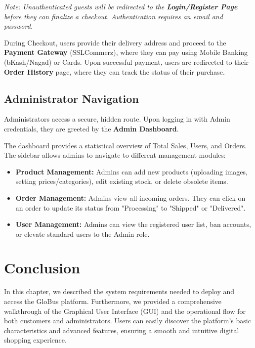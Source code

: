 \textit{Note: Unauthenticated guests will be redirected to the \textbf{Login/Register Page} before they can finalize a checkout. Authentication requires an email and password.}

During Checkout, users provide their delivery address and proceed to the \textbf{Payment Gateway} (SSLCommerz), where they can pay using Mobile Banking (bKash/Nagad) or Cards. Upon successful payment, users are redirected to their \textbf{Order History} page, where they can track the status of their purchase.

\subsection{Administrator Navigation}
Administrators access a secure, hidden route. Upon logging in with Admin credentials, they are greeted by the \textbf{Admin Dashboard}.

The dashboard provides a statistical overview of Total Sales, Users, and Orders. The sidebar allows admins to navigate to different management modules:
\begin{itemize}
    \item \textbf{Product Management:} Admins can add new products (uploading images, setting prices/categories), edit existing stock, or delete obsolete items.
    \item \textbf{Order Management:} Admins view all incoming orders. They can click on an order to update its status from "Processing" to "Shipped" or "Delivered".
    \item \textbf{User Management:} Admins can view the registered user list, ban accounts, or elevate standard users to the Admin role.
\end{itemize}

\section{Conclusion}
In this chapter, we described the system requirements needed to deploy and access the GloBus platform. Furthermore, we provided a comprehensive walkthrough of the Graphical User Interface (GUI) and the operational flow for both customers and administrators. Users can easily discover the platform's basic characteristics and advanced features, ensuring a smooth and intuitive digital shopping experience.
